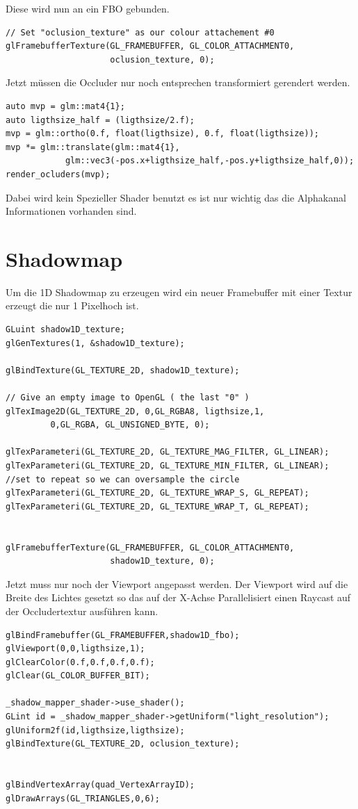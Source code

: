 Diese wird nun an ein FBO gebunden.
\begin{lstlisting}
// Set "oclusion_texture" as our colour attachement #0
glFramebufferTexture(GL_FRAMEBUFFER, GL_COLOR_ATTACHMENT0, 
					 oclusion_texture, 0);
\end{lstlisting}

Jetzt müssen die Occluder nur noch entsprechen transformiert gerendert werden.
\begin{lstlisting}
auto mvp = glm::mat4{1};
auto ligthsize_half = (ligthsize/2.f);
mvp = glm::ortho(0.f, float(ligthsize), 0.f, float(ligthsize));
mvp *= glm::translate(glm::mat4{1},
			glm::vec3(-pos.x+ligthsize_half,-pos.y+ligthsize_half,0));
render_ocluders(mvp);
\end{lstlisting}

Dabei wird kein Spezieller Shader benutzt es ist nur wichtig das die Alphakanal Informationen vorhanden sind.

\section{Shadowmap}
Um die 1D Shadowmap zu erzeugen wird ein neuer Framebuffer mit einer Textur erzeugt die nur 1 Pixelhoch ist.
\begin{lstlisting}
GLuint shadow1D_texture;
glGenTextures(1, &shadow1D_texture);

glBindTexture(GL_TEXTURE_2D, shadow1D_texture);

// Give an empty image to OpenGL ( the last "0" )
glTexImage2D(GL_TEXTURE_2D, 0,GL_RGBA8, ligthsize,1,
		 0,GL_RGBA, GL_UNSIGNED_BYTE, 0);

glTexParameteri(GL_TEXTURE_2D, GL_TEXTURE_MAG_FILTER, GL_LINEAR);
glTexParameteri(GL_TEXTURE_2D, GL_TEXTURE_MIN_FILTER, GL_LINEAR);
//set to repeat so we can oversample the circle
glTexParameteri(GL_TEXTURE_2D, GL_TEXTURE_WRAP_S, GL_REPEAT); 
glTexParameteri(GL_TEXTURE_2D, GL_TEXTURE_WRAP_T, GL_REPEAT);


glFramebufferTexture(GL_FRAMEBUFFER, GL_COLOR_ATTACHMENT0,
					 shadow1D_texture, 0);
\end{lstlisting}

Jetzt muss nur noch der Viewport angepasst werden. Der Viewport wird auf die Breite des Lichtes gesetzt so das auf der X-Achse Parallelisiert einen Raycast auf der Occludertextur ausführen kann.

\begin{lstlisting}
glBindFramebuffer(GL_FRAMEBUFFER,shadow1D_fbo);
glViewport(0,0,ligthsize,1);
glClearColor(0.f,0.f,0.f,0.f);
glClear(GL_COLOR_BUFFER_BIT);

_shadow_mapper_shader->use_shader();
GLint id = _shadow_mapper_shader->getUniform("light_resolution");
glUniform2f(id,ligthsize,ligthsize);
glBindTexture(GL_TEXTURE_2D, oclusion_texture);


glBindVertexArray(quad_VertexArrayID);
glDrawArrays(GL_TRIANGLES,0,6);
\end{lstlisting}

